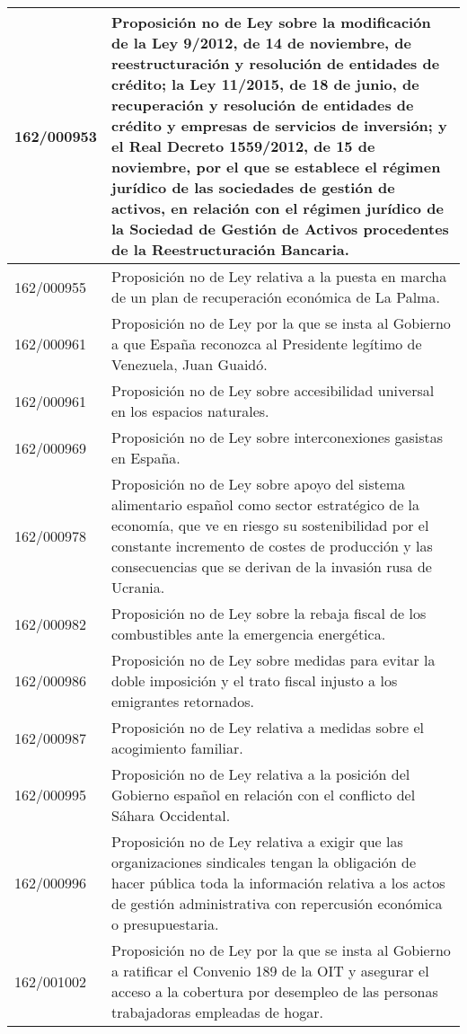 {\begin{table}[H]
\begin{center}
\begin{tabularx}{\linewidth}{| l | X |}
\hline
162/000953 & Proposición no de Ley sobre la modificación de la Ley 9/2012, de 14 de noviembre, de reestructuración y resolución de entidades de crédito; la Ley 11/2015, de 18 de junio, de recuperación y resolución de entidades de crédito y empresas de servicios de inversión; y el Real Decreto 1559/2012, de 15 de noviembre, por el que se establece el régimen jurídico de las sociedades de gestión de activos, en relación con el régimen jurídico de la Sociedad de Gestión de Activos procedentes de la Reestructuración Bancaria. \\
\hline
162/000955 & Proposición no de Ley relativa a la puesta en marcha de un plan de recuperación económica de La Palma. \\
\hline
162/000961 & Proposición no de Ley por la que se insta al Gobierno a que España reconozca al Presidente legítimo de Venezuela, Juan Guaidó. \\
\hline
162/000961 & Proposición no de Ley sobre accesibilidad universal en los espacios naturales. \\
\hline
162/000969 & Proposición no de Ley sobre interconexiones gasistas en España. \\
\hline
162/000978 & Proposición no de Ley sobre apoyo del sistema alimentario español como sector estratégico de la economía, que ve en riesgo su sostenibilidad por el constante incremento de costes de producción y las consecuencias que se derivan de la invasión rusa de Ucrania. \\
\hline
162/000982 & Proposición no de Ley sobre la rebaja fiscal de los combustibles ante la emergencia energética. \\
\hline
162/000986 & Proposición no de Ley sobre medidas para evitar la doble imposición y el trato fiscal injusto a los emigrantes retornados. \\
\hline
162/000987 & Proposición no de Ley relativa a medidas sobre el acogimiento familiar. \\
\hline
162/000995 & Proposición no de Ley relativa a la posición del Gobierno español en relación con el conflicto del Sáhara Occidental. \\
\hline
162/000996 & Proposición no de Ley relativa a exigir que las organizaciones sindicales tengan la obligación de hacer pública toda la información relativa a los actos de gestión administrativa con repercusión económica o presupuestaria. \\
\hline
162/001002 & Proposición no de Ley por la que se insta al Gobierno a ratificar el Convenio 189 de la OIT y asegurar el acceso a la cobertura por desempleo de las personas trabajadoras empleadas de hogar. \\

\end{tabularx}
\end{center}
\end{table}}
